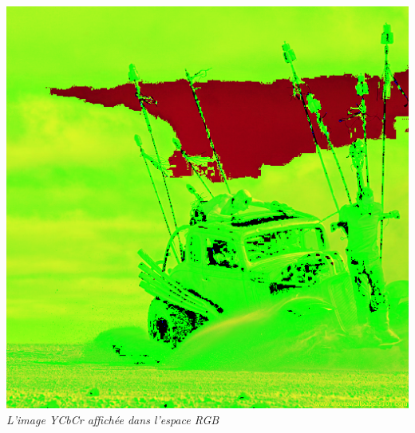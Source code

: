 \documentclass[a4paper,11pt]{article}
\begin{document}
\begin{center}
\includegraphics[scale=0.5]{./imgs/madmaxYCbCr.png}\\
\textit{L'image YCbCr affichée dans l'espace RGB}
\end{center}
\end{document}
